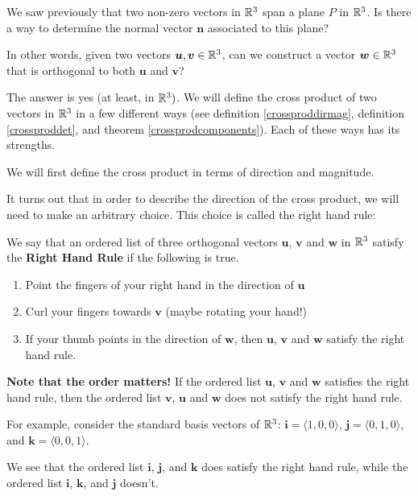 We saw previously that two non-zero vectors in $\mathbb{R}^3$ span a plane $P$ in $\mathbb{R}^3$.  Is there a way to determine the normal vector $\bm{n}$ associated to this plane?

\begin{motivating}

In other words, given two vectors $\bm{u}, \bm{v} \in \mathbb{R}^3$, can we construct a vector $\bm{w} \in \mathbb{R}^3$ that is orthogonal to both $\bm{u}$ and $\bm{v}$?
\end{motivating} 

The answer is yes (at least, in $\mathbb{R}^3)$. We will define the cross product of two vectors in $\mathbb{R}^3$ in a few different ways (see definition \ref{crossproddirmag}, definition \ref{crossproddet}, and theorem \ref{crossprodcomponents}).  Each of these ways has its strengths.

We will first define the cross product in terms of direction and magnitude.

It turns out that in order to describe the direction of the cross product, we will need to make an arbitrary choice. This choice is called the right hand rule: 

\begin{definition}
    We say that an ordered list of three orthogonal vectors $\bm{u}$, $\bm{v}$ and $\bm{w}$ in $\mathbb{R}^3$ satisfy the \textbf{Right Hand Rule} if the following is true.
    
    \begin{enumerate}
        \item Point the fingers of your right hand in the direction of $\bm{u}$
        \item Curl your fingers towards $\bm{v}$ (maybe rotating your hand!)
        \item If your thumb points in the direction of $\bm{w}$, then $\bm{u}$, $\bm{v}$ and $\bm{w}$ satisfy the right hand rule.
    \end{enumerate}
    
    \end{definition}

\textbf{Note that the order matters!} If the ordered list $\bm{u}$, $\bm{v}$ and $\bm{w}$ satisfies the right hand rule, then the ordered list $\bm{v}$, $\bm{u}$ and $\bm{w}$ does not satisfy the right hand rule.

\begin{example}
    For example, consider the standard basis vectors of $\mathbb{R}^3$:  $\bm{i} = \langle 1, 0 , 0 \rangle$, $\bm{j}= \langle 0,1 , 0 \rangle$, and $\bm{k}= \langle 0 , 0,1 \rangle$.

    We see that the ordered list $\bm{i}$, $\bm{j}$, and $\bm{k}$ does satisfy the right hand rule, while the ordered list $\bm{i}$, $\bm{k}$, and $\bm{j}$ doesn't.
\end{example}


